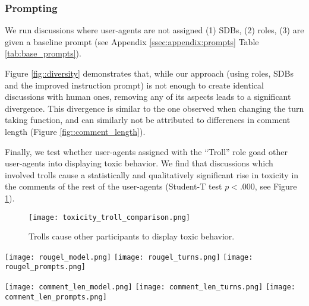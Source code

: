 \subsubsection{Prompting}

We run discussions where user-agents are not assigned (1) \acp{SDB}, (2) roles, (3) are given a baseline prompt (see Appendix \ref{ssec:appendix:prompts} Table \ref{tab:base_prompts}).

Figure \ref{fig::diversity} demonstrates that, while our approach (using roles, \acp{SDB} and the improved instruction prompt) is not enough to create identical discussions with human ones, removing any of its aspects leads to a significant divergence. This divergence is similar to the one observed when changing the turn taking function, and can similarly not be attributed to differences in comment length (Figure \ref{fig::comment_length}).

Finally, we test whether user-agents assigned with the “Troll” role goad other user-agents into displaying toxic behavior. We find that discussions which involved trolls cause a statistically and qualitatively significant rise in toxicity in the comments of the rest of the user-agents (Student-T test $p<.000$, see Figure \ref{fig::goad}).

\begin{figure}
    \texttt{[image: toxicity\_troll\_comparison.png]} 
	\caption{Trolls cause other participants to display toxic behavior.}
	\label{fig::goad}
\end{figure}

\begin{figure*}[t]
    \texttt{[image: rougel\_model.png]} \hfill
    \texttt{[image: rougel\_turns.png]}
    \hfill
    \texttt{[image: rougel\_prompts.png]}
	\centering
	\caption{Diversity (Section \ref{ssec:methodology:diversity}) distribution for each discussion by model (Section \ref{ssec:experimental:model}), turn-taking function $u$ (Section \ref{ssec:experimental:turn}), and prompting function $\phi$ used (Section \ref{ssec:experimental:prompts}).}
	\label{fig::diversity}
\end{figure*}

\begin{figure*}[t]
    \texttt{[image: comment\_len\_model.png]} \hfill
    \texttt{[image: comment\_len\_turns.png]}
    \hfill
    \texttt{[image: comment\_len\_prompts.png]}
	\centering
	\caption{Comment length for each discussion by model (Section \ref{ssec:experimental:model}), turn-taking function $u$ (Section \ref{ssec:experimental:turn}), and prompting function $\phi$ used (Section \ref{ssec:experimental:prompts}). For ease of comparison, comments above $400$ words are marked at the end of the x-axis.}
	\label{fig::comment_length}
\end{figure*}



